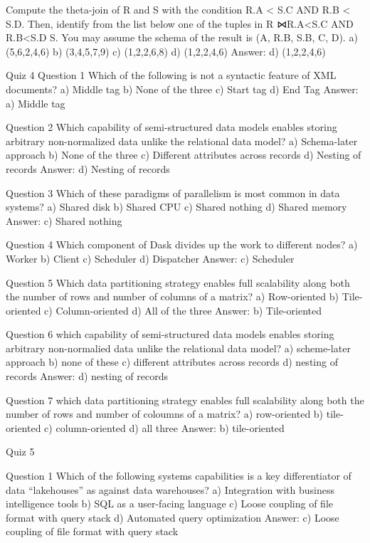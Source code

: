   Compute the theta-join of R and S with the condition R.A < S.C AND R.B < S.D. Then, identify from the list below one of the tuples in R ⋈R.A<S.C AND R.B<S.D S. You may assume the schema of the result is (A, R.B, S.B, C, D).
  a) (5,6,2,4,6)
  b) (3,4,5,7,9)
  c) (1,2,2,6,8)
  d) (1,2,2,4,6)
  Answer: d) (1,2,2,4,6)

Quiz 4
  Question 1
  Which of the following is not a syntactic feature of XML documents?
  a) Middle tag
  b) None of the three
  c) Start tag
  d) End Tag
  Answer: a) Middle tag

  Question 2
  Which capability of semi-structured data models enables storing arbitrary non-normalized data unlike the relational data model?
  a) Schema-later approach
  b) None of the three
  c) Different attributes across records
  d) Nesting of records
  Answer: d) Nesting of records

  Question 3
  Which of these paradigms of parallelism is most common in data systems?
  a) Shared disk
  b) Shared CPU
  c) Shared nothing
  d) Shared memory
  Answer: c) Shared nothing

  Question 4
  Which component of Dask divides up the work to different nodes?
  a) Worker
  b) Client
  c) Scheduler
  d) Dispatcher
  Answer: c) Scheduler

  Question 5
  Which data partitioning strategy enables full scalability along both the number of rows and number of columns of a matrix?
  a) Row-oriented
  b) Tile-oriented
  c) Column-oriented
  d) All of the three
  Answer: b) Tile-oriented

  Question 6
  which capability of semi-structured data models enables storing arbitrary non-normalied data unlike the relational data model?
  a) scheme-later approach
  b) none of these
  c) different attributes across records
  d) nesting of records
  Answer: d) nesting of records

  Question 7
  which data partitioning strategy enables full scalability along both the number of rows and number of coloumns of a matrix?
  a) row-oriented
  b) tile-oriented
  c) column-oriented
  d) all three
  Answer: b) tile-oriented
  
Quiz 5

  Question 1
  Which of the following systems capabilities is a key differentiator of data “lakehouses” as against data warehouses?
  a) Integration with business intelligence tools
  b) SQL as a user-facing language
  c) Loose coupling of file format with query stack
  d) Automated query optimization
  Answer: c) Loose coupling of file format with query stack

